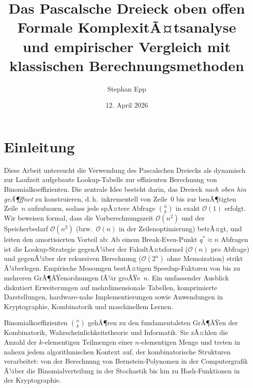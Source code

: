 ﻿\documentclass[12pt, a4paper]{article}
\title{\textbf{Das Pascalsche Dreieck oben offen}\\
	Formale KomplexitÃ¤tsanalyse und empirischer Vergleich mit klassischen Berechnungsmethoden}
\author{Stephan Epp}
\date{12. April 2026}
\newcommand{\Oh}{\mathcal{O}}
\theoremstyle{plain}
\theoremstyle{definition}
\theoremstyle{remark}
\renewcommand{\Oh}{\mathcal{O}}
\begin{document}
\maketitle
\tableofcontents
\newpage

\section{Einleitung}
\label{sec:einleitung}
Diese Arbeit untersucht die Verwendung des Pascalschen Dreiecks als
dynamisch zur Laufzeit aufgebaute Lookup-Tabelle zur effizienten
Berechnung von Binomialkoeffizienten. Die zentrale Idee besteht darin,
das Dreieck \emph{nach oben hin geÃ¶ffnet} zu konstruieren, d.\,h.\
inkrementell von Zeile~0 bis zur benÃ¶tigten Zeile~$n$ aufzubauen,
sodass jede spÃ¤tere Abfrage $\binom{n}{k}$ in exakt $\Oh(1)$ erfolgt.
Wir beweisen formal, dass die Vorberechnungszeit $\Oh(n^2)$ und der
Speicherbedarf $\Oh(n^2)$ (bzw.\ $\Oh(n)$ in der Zeilenoptimierung)
betrÃ¤gt, und leiten den amortisierten Vorteil ab: Ab einem
Break-Even-Punkt $q^* \approx n$ Abfragen ist die Lookup-Strategie
gegenÃ¼ber der FakultÃ¤tsformel ($\Oh(n)$ pro Abfrage) und gegenÃ¼ber
der rekursiven Berechnung ($\Oh(2^n)$ ohne Memoization) strikt
Ã¼berlegen. Empirische Messungen bestÃ¤tigen Speedup-Faktoren von bis
zu mehreren GrÃ¶ÃŸenordnungen fÃ¼r groÃŸe~$n$. Ein umfassender Ausblick
diskutiert Erweiterungen auf mehrdimensionale Tabellen, komprimierte
Darstellungen, hardware-nahe Implementierungen sowie Anwendungen in
Kryptographie, Kombinatorik und maschinellem Lernen.

Binomialkoeffizienten $\binom{n}{k}$ gehÃ¶ren zu den fundamentalsten
GrÃ¶ÃŸen der Kombinatorik, Wahrscheinlichkeitstheorie und Informatik.
Sie zÃ¤hlen die Anzahl der $k$-elementigen Teilmengen einer $n$-elementigen
Menge und treten in nahezu jedem algorithmischen Kontext auf, der
kombinatorische Strukturen verarbeitet: von der Berechnung von
Bernstein-Polynomen in der Computergrafik Ã¼ber die Binomialverteilung
in der Stochastik bis hin zu Hash-Funktionen in der Kryptographie.
\end{document}
